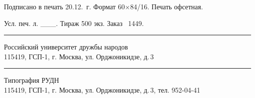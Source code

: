 {\footnotesize{

\noindent
\begin{center}
  Подписано в печать 20.12.\bookyear{}~г. Формат 60$\times$84/16. Печать офсетная.
   
  Усл. печ. л. \_\_\_. Тираж 500 экз.  Заказ \No~1449.
\end{center}

\smallskip

\hrule

\smallskip

\begin{center}
  Российский университет дружбы народов\\
 115419, ГСП-1, г. Москва, ул. Орджоникидзе, д.\,3
\end{center}

\smallskip

\hrule

\smallskip
\begin{center}
  Типография РУДН \\
   115419, ГСП-1, г. Москва, ул. Орджоникидзе, д.\,3, тел. 952-04-41
\end{center}

}}









